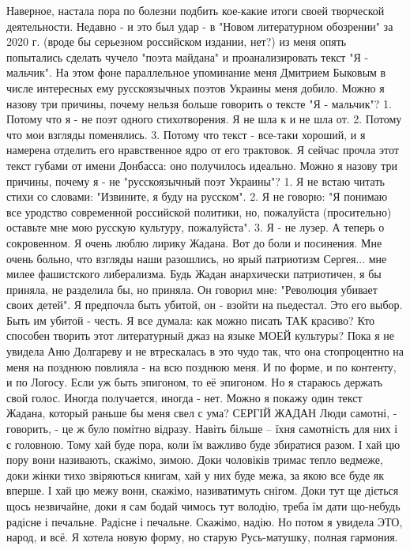 Наверное, настала пора по болезни подбить кое-какие итоги своей творческой деятельности. Недавно - и это был удар - в "Новом литературном обозрении" за 2020 г. (вроде бы серьезном российском издании, нет?) из меня опять попытались сделать чучело "поэта майдана" и проанализировать текст "Я - мальчик". На этом фоне параллельное упоминание меня Дмитрием Быковым в числе интересных ему русскоязычных поэтов Украины меня добило. 
Можно я назову три причины, почему нельзя больше говорить о тексте "Я - мальчик"?
1. Потому что я - не поэт одного стихотворения. Я не шла к и не шла от.
2. Потому что мои взгляды поменялись. 
3. Потому что текст - все-таки хороший, и я намерена отделить его нравственное ядро от его трактовок. Я сейчас прочла этот текст губами от имени Донбасса: оно получилось идеально. 
Можно я назову три причины, почему я - не "русскоязычный поэт Украины"? 
1. Я не встаю читать стихи со словами: "Извините, я буду на русском".
2. Я не говорю: "Я понимаю все уродство современной российской политики, но, пожалуйста (просительно) оставьте мне мою русскую культуру, пожалуйста".
3. Я - не лузер. 
А теперь о сокровенном. Я очень люблю лирику Жадана. Вот до боли и посинения. Мне очень больно, что взгляды наши разошлись, но ярый патриотизм Сергея... мне милее фашистского либерализма. Будь Жадан анархически патриотичен, я бы приняла, не разделила бы, но приняла. Он говорил мне: "Революция убивает своих детей". Я предпочла быть убитой, он - взойти на пьедестал. Это его выбор. Быть им убитой - честь.
Я все думала: как можно писать ТАК красиво? Кто способен творить этот литературный джаз на языке МОЕЙ культуры? Пока я не увидела Аню Долгареву и не втрескалась в это чудо так, что она стопроцентно на меня на позднюю повлияла - на всю позднюю меня. И по форме, и по контенту, и по Логосу. Если уж быть эпигоном, то её эпигоном. Но я стараюсь держать свой голос. Иногда получается, иногда - нет. Можно я покажу один текст Жадана, который раньше бы меня свел с ума?
СЕРГІЙ ЖАДАН
Люди самотні, - говорить, - це ж було помітно відразу.
Навіть більше – їхня самотність для них і є головною.
Тому хай буде пора, коли їм важливо буде збиратися разом.
І хай цю пору вони називають, скажімо, зимою.
Доки чоловіків тримає тепло ведмеже,
доки жінки тихо звіряються книгам,
хай у них буде межа, за якою все буде як вперше.
І хай цю межу вони, скажімо, називатимуть снігом.
Доки тут ще діється щось незвичайне,
доки я сам бодай чимось тут володію,
треба їм дати що-небудь радісне і печальне.
Радісне і печальне. Скажімо, надію.
Но потом я увидела ЭТО, народ, и всё. Я хотела новую форму, но старую Русь-матушку, полная гармония. 
